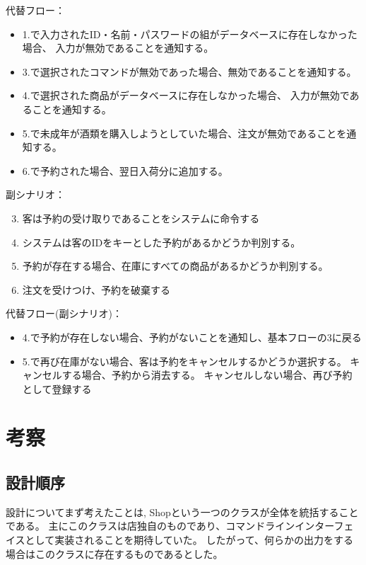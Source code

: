 \documentclass[a4paper,11pt]{jsarticle}
\begin{document}
代替フロー：
\begin{itemize}
    \item 1.で入力されたID・名前・パスワードの組がデータベースに存在しなかった場合、
    入力が無効であることを通知する。
    \item 3.で選択されたコマンドが無効であった場合、無効であることを通知する。
    \item 4.で選択された商品がデータベースに存在しなかった場合、
    入力が無効であることを通知する。
    \item 5.で未成年が酒類を購入しようとしていた場合、注文が無効であることを通知する。
    \item 6.で予約された場合、翌日入荷分に追加する。
\end{itemize}

副シナリオ：
\begin{enumerate}
    \setcounter{enumi}{2}
    \item 客は予約の受け取りであることをシステムに命令する
    \item システムは客のIDをキーとした予約があるかどうか判別する。
    \item 予約が存在する場合、在庫にすべての商品があるかどうか判別する。
    \item 注文を受けつけ、予約を破棄する
\end{enumerate}

代替フロー(副シナリオ)：
\begin{itemize}
    \item 4.で予約が存在しない場合、予約がないことを通知し、基本フローの3に戻る
    \item 5.で再び在庫がない場合、客は予約をキャンセルするかどうか選択する。
    キャンセルする場合、予約から消去する。
    キャンセルしない場合、再び予約として登録する
\end{itemize}

\section{考察}
\subsection{設計順序}

設計についてまず考えたことは, Shopという一つのクラスが全体を統括することである。
主にこのクラスは店独自のものであり、コマンドラインインターフェイスとして実装されることを期待していた。
したがって、何らかの出力をする場合はこのクラスに存在するものであるとした。
\end{document}
